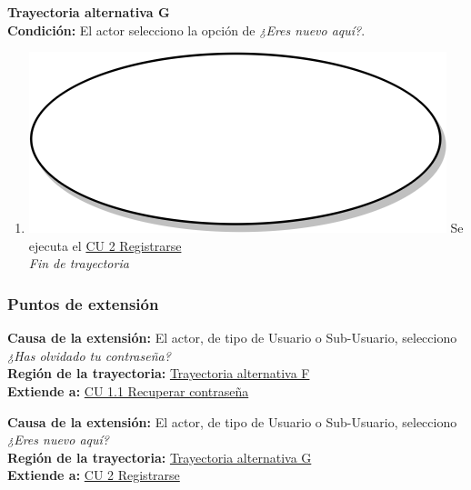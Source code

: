 \textbf{Trayectoria alternativa G} \label{cu1_ta_g}\\
\textbf{Condición:} El actor selecciono la opción de \textit{¿Eres nuevo aquí?}.\\
 \begin{enumerate}[label=G\arabic*]
    \item {\includegraphics[scale=.05]{Capitulo3/img/proceso.png} Se ejecuta el \hyperref[cu2]{CU 2 Registrarse}} \\
    \textit{Fin de trayectoria} \\
\end{enumerate}

\subsubsection{Puntos de extensión}
\noindent \textbf{Causa de la extensión:} El actor, de tipo de Usuario o Sub-Usuario, selecciono \textit{¿Has olvidado tu contraseña?} \\
\textbf{Región de la trayectoria:} \hyperref[cu1_ta_f]{Trayectoria alternativa F} \\
\textbf{Extiende a:} \hyperref[cu1_1]{CU 1.1 Recuperar contraseña} \\ \par

\noindent \textbf{Causa de la extensión:} El actor, de tipo de Usuario o Sub-Usuario, selecciono \textit{¿Eres nuevo aquí?} \\
\textbf{Región de la trayectoria:} \hyperref[cu1_ta_G]{Trayectoria alternativa G} \\
\textbf{Extiende a:} \hyperref[cu2]{CU 2 Registrarse}
